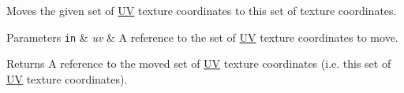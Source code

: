 Moves the given set of \hyperlink{structmage_1_1_u_v}{UV} texture coordinates to this set of texture coordinates.


\begin{DoxyParams}[1]{Parameters}
\mbox{\tt in}  & {\em uv} & A reference to the set of \hyperlink{structmage_1_1_u_v}{UV} texture coordinates to move. \\
\hline
\end{DoxyParams}
\begin{DoxyReturn}{Returns}
A reference to the moved set of \hyperlink{structmage_1_1_u_v}{UV} texture coordinates (i.\+e. this set of \hyperlink{structmage_1_1_u_v}{UV} texture coordinates). 
\end{DoxyReturn}
